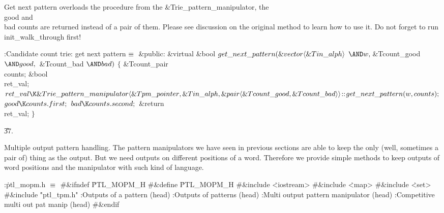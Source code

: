 Get next pattern overloads the procedure from the
\&{Trie\_pattern\_manipulator}, the \\{good} and \\{bad} counts are returned
instead of a pair of them. Please see discussion on the original method
to learn how to use it. Do not forget to run \\{init\_walk\_through} first!

\Y\B\4:Candidate count trie: get next pattern\X${}\equiv{}$\6
\4\&{public}:\6
\&{virtual} \&{bool} ${}\\{get\_next\_pattern}(\&{vector}\langle\&{Tin\_alph}%
\rangle{}$ ${}{\AND}\|w,\39{}$\&{Tcount\_good} ${}{\AND}\\{good},\39{}$%
\&{Tcount\_bad} ${}{\AND}\\{bad}){}$\1\1\2\2\6
${}\{{}$\1\6
\&{Tcount\_pair} \\{counts};\6
\&{bool} \\{ret\_val};\7
${}\\{ret\_val}\K\&{Trie\_pattern\_manipulator}\langle\&{Tpm\_pointer},\39%
\&{Tin\_alph},\39\&{pair}\langle\&{Tcount\_good},\39\&{Tcount\_bad}\rangle%
\rangle\DC\\{get\_next\_pattern}(\|w,\39\\{counts});{}$\6
${}\\{good}\K\\{counts}.\\{first};{}$\6
${}\\{bad}\K\\{counts}.\\{second};{}$\6
\&{return} \\{ret\_val};\6
\4${}\}{}$\2\par
\U37.\fi

Multiple output pattern handling. The pattern manipulators we have
seen in previous sections are able to keep the only (well, sometimes a
pair of) thing as the output. But we need outputs on different positions
of a word. Therefore we provide simple methods to keep outputs of word
positions and the manipulator with such kind of language.

\Y\B\4:\.{ptl\_mopm.h }\X${}\equiv{}$\6
\8\#\&{ifndef} \.{PTL\_MOPM\_H}\6
\8\#\&{define} \.{PTL\_MOPM\_H}\6
\8\#\&{include} \.{<iostream>}\6
\8\#\&{include} \.{<map>}\6
\8\#\&{include} \.{<set>}\6
\8\#\&{include} \.{"ptl\_tpm.h"}\6
:Outputs of a pattern (head)\X\6
:Outputs of patterns (head)\X\6
:Multi output pattern manipulator (head)\X\6
:Competitive multi out pat manip (head)\X\6
\8\#\&{endif}\par
\fi

